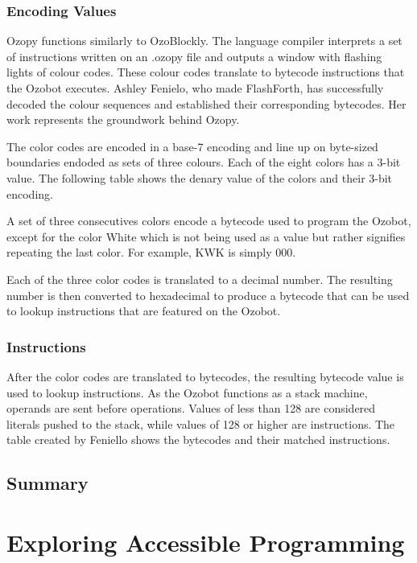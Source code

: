 \documentclass[oneside,%
                    author={Malak Hajji},
                    degree={BSc},
                    title={Designing An Accessible Computational Toolkit For Students},
                  subtitle={With Mixed Visual Abilities}]{dissertation}
\begin{document}
\subsection{Encoding Values}
Ozopy functions similarly to OzoBlockly. The language compiler interprets a set of instructions written on an .ozopy file and outputs a window with flashing lights  of colour codes. These colour codes translate to bytecode instructions that the Ozobot executes. Ashley Fenielo, who made FlashForth, has successfully decoded the colour sequences and established their corresponding bytecodes. Her work represents the groundwork behind Ozopy.

The color codes are encoded in a base-7 encoding and line up on byte-sized boundaries endoded as sets of three colours. Each of the eight colors has a 3-bit value. The following table shows the denary value of the colors and their 3-bit encoding.



A set of three consecutives colors encode a bytecode used to program the Ozobot, except for the color White which is not being used as a value but rather signifies repeating the last color. For example, KWK is simply 000.

Each of the three color codes is translated to a decimal number. The resulting number is then converted to hexadecimal to produce a bytecode that can be used to lookup instructions that are featured on the Ozobot. 

\subsection{Instructions}
After the color codes are translated to bytecodes, the resulting bytecode value is used to lookup instructions. As the Ozobot functions as a stack machine, operands are sent before operations.
Values of less than 128 are considered literals pushed to the stack, while values of 128 or higher are instructions. The table created by Feniello shows the bytecodes and their matched instructions. 


\section{Summary}
\chapter{Exploring Accessible Programming}
\end{document}
